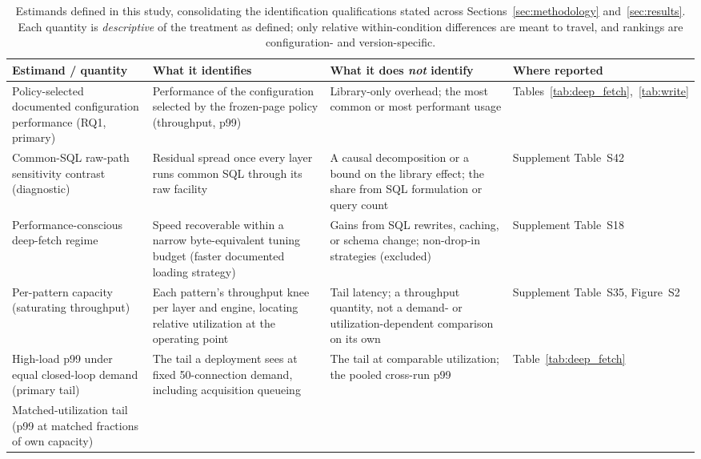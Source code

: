 \begin{table}[htbp]
  \centering
  \small
  \caption{Estimands defined in this study, consolidating the identification qualifications
    stated across Sections~\ref{sec:methodology} and~\ref{sec:results}. Each quantity is
    \emph{descriptive} of the treatment as defined; only relative within-condition differences are
    meant to travel, and rankings are configuration- and version-specific.}
  \label{tab:estimands}
  \begin{adjustbox}{max width=\textwidth}
  \begin{tabular}{@{}p{2.7cm} p{4.0cm} p{4.0cm} p{2.7cm}@{}}
    \toprule
    \textbf{Estimand / quantity} & \textbf{What it identifies} & \textbf{What it does \emph{not} identify} & \textbf{Where reported} \\
    \midrule
    Policy-selected documented configuration performance (RQ1, primary) &
    Performance of the configuration selected by the frozen-page policy (throughput, p99) &
    Library-only overhead; the most common or most performant usage &
    Tables~\ref{tab:deep_fetch},~\ref{tab:write} \\
    \addlinespace
    Common-SQL raw-path sensitivity contrast (diagnostic) &
    Residual spread once every layer runs common SQL through its raw facility &
    A causal decomposition or a bound on the library effect; the share from SQL formulation or query count &
    Supplement Table~S42 \\
    \addlinespace
    Performance-conscious deep-fetch regime &
    Speed recoverable within a narrow byte-equivalent tuning budget (faster documented loading strategy) &
    Gains from SQL rewrites, caching, or schema change; non-drop-in strategies (excluded) &
    Supplement Table~S18 \\
    \addlinespace
    Per-pattern capacity (saturating throughput) &
    Each pattern's throughput knee per layer and engine, locating relative utilization at the operating point &
    Tail latency; a throughput quantity, not a demand- or utilization-dependent comparison on its own &
    Supplement Table~S35, Figure~S2 \\
    \addlinespace
    High-load p99 under equal closed-loop demand (primary tail) &
    The tail a deployment sees at fixed 50-connection demand, including acquisition queueing &
    The tail at comparable utilization; the pooled cross-run p99 &
    Table~\ref{tab:deep_fetch} \\
    \addlinespace
    Matched-utilization tail (p99 at matched fractions of own capacity) &

\end{tabular}
\end{adjustbox}
\end{table}
